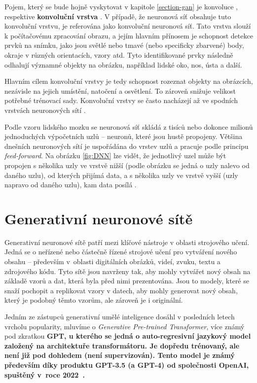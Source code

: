 Pojem, který se bude hojně vyskytovat v kapitole \ref{section-gan} je konvoluce \cite{weisstein2003convolution}, respektive \textbf{konvoluční vrstva} \cite{ElementCNN}. V případě, že neuronová síť obsahuje tuto konvoluční vrstvu, je referována jako konvoluční neuronová síť. Tato vrstva slouží k počítačovému zpracování obrazu, a jejím hlavním přínosem je schopnost detekce prvků na snímku, jako jsou světlé nebo tmavé (nebo specificky zbarvené) body, okraje v různých orientacích, vzory atd. Tyto identifikované prvky následně odhalují významné objekty na obrázku, například lidské oko, nos, ústa a další. 

Hlavním cílem konvoluční vrstvy je tedy schopnost rozeznat objekty na obrázcích, nezávisle na jejich umístění, natočení a osvětlení. To zároveň snižuje velikost potřebné trénovací sady. Konvoluční vrstvy se často nacházejí až ve spodních vrstvách neuronových sítí \cite{ElementCNN}.

\bigskip

\noindent Podle vzoru lidského mozku se neuronová síť skládá z tisíců nebo dokonce milionů jednoduchých výpočetních uzlů -- neuronů, které jsou hustě propojeny. Většina dnešních neuronových sítí je uspořádána do vrstev uzlů a pracuje podle principu \textit{feed-forward}. Na obrázku \ref{fig:DNN} lze vidět, že jednotlivý uzel může být propojen s několika uzly ve vrstvě nižší (podle obrázku se jedná o uzly nalevo od daného uzlu), od kterých přijímá data, a s několika uzly ve vrstvě vyšší (uzly napravo od daného uzlu), kam data posílá \cite{MITNN}.

\section{Generativní neuronové sítě}

Generativní neuronové sítě \cite{MediumAI} patří mezi klíčové nástroje v oblasti strojového učení. Jedná se o neřízené nebo částečně řízené strojové učení pro vytváření nového obsahu -- především v~oblasti digitálních obrázků, videí, zvuku, textu a zdrojového kódu. Tyto sítě jsou navrženy tak, aby mohly vytvářet nový obsah na základě vzorů a dat, která byla před nimi prezentována. Jsou to modely, které se snaží pochopit a replikovat vzory v datech, aby mohly generovat nový obsah, který je podobný těmto vzorům, ale zároveň je i originální.

\bigskip

\noindent Jedním ze zástupců generativní umělé inteligence dosáhl v posledních letech vrcholu popularity, mluvíme o \textit{Generative Pre-trained Transformer}, více známý pod zkratkou \bf GPT\rm, u kterého se jedná o auto-regresivní jazykový model založený na architektuře transformátoru. Je dopředu trénovaný, ale není již pod dohledem (není supervizován). Tento model je známý především díky produktu GPT-3.5 (a GPT-4) od společnosti OpenAI, spuštěný v~roce 2022~\cite{MediumAI}.

